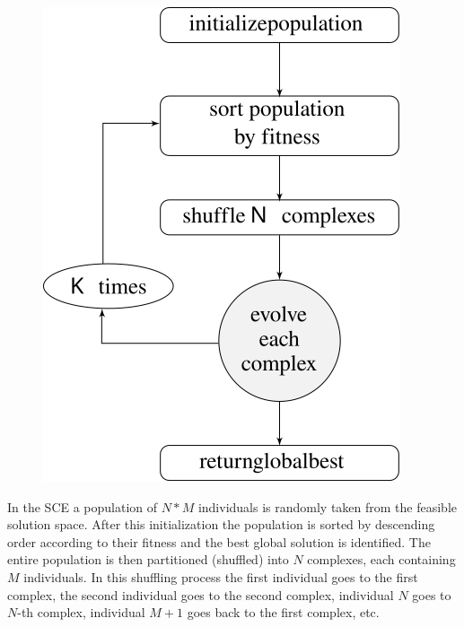 \documentclass[a0,portrait]{a0poster}
\begin{document}
\begin{multicols}{2}
\begin{figure}
  \includegraphics[scale=1.5]{flow1}
  \label{fig:flow1}
\end{figure}

In the SCE a population of $N*M$ individuals is randomly taken from the
feasible solution space.
After this initialization the population is sorted by descending order according
to their fitness and the best global solution is identified.
The entire population is then partitioned (shuffled) into $N$ complexes,
each containing $M$ individuals.
In this shuffling process the first individual goes to the first complex, the second
individual goes to the second complex, individual $N$ goes to $N$-th complex,
individual $M+1$ goes back to the first complex, etc.


\end{multicols}
\end{document}
